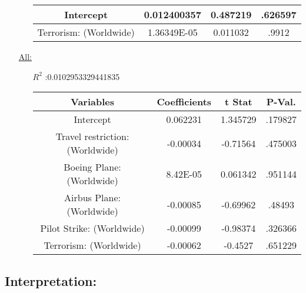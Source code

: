 \documentclass[12pt]{report}
\begin{document}
\begin{enumerate}
\begin{enumerate}
\begin{tabular}{|c|c|c|c|}
                    Intercept & 0.012400357 &  0.487219 &.626597 \\  \hline
                    Terrorism: (Worldwide) & 1.36349E-05 & 0.011032 & .9912\\  \hline
                    \bottomrule
                \end{tabular}





        \end{enumerate}
    \item[\underline{All:}]
    \begin{samepage}

        \begin{enumerate}
            \item[$R^2$]:0.0102953329441835
            \item[]
                \begin{tabular}{|c|c|c|c|}
                    \toprule  \hline
                    \textbf{Variables} & \textbf{Coefficients} & \textbf{t Stat}&\textbf{P-Val.} \\  \hline

                    Intercept & 0.062231 &  1.345729 & .179827\\  \hline
                    Travel restriction: (Worldwide) & -0.00034 &  -0.71564 & .475003\\  \hline
                    Boeing Plane: (Worldwide) & 8.42E-05 &  0.061342 &.951144\\  \hline
                    Airbus Plane: (Worldwide) & -0.00085 &  -0.69962 &.48493 \\  \hline
                    Pilot Strike: (Worldwide) & -0.00099 &  -0.98374 &.326366 \\  \hline
                    Terrorism: (Worldwide) & -0.00062 &  -0.4527 &.651229 \\  \hline
                    \bottomrule
                \end{tabular}





        \end{enumerate}
        \end{samepage}
\end{enumerate}
\subsection*{Interpretation:}
\end{document}
